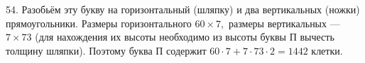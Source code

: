 54. Разобьём эту букву на горизонтальный (шляпку) и два вертикальных (ножки) прямоугольники. Размеры горизонтального $60\times7,$ размеры вертикальных --- $7\times73$ (для нахождения их высоты необходимо из высоты буквы П вычесть толщину шляпки). Поэтому буква П содержит $60\cdot7+7\cdot73\cdot2=1442$ клетки.\\
